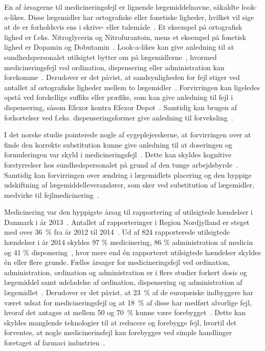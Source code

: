 En af årsagerne til medicineringsfejl er lignende lægemiddelnavne, såkaldte look-a-likes. Disse lægemidler har ortografiske eller fonetiske ligheder, hvilket vil sige at de er forholdsvis ens i skrive- eller talemåde~\citep{Garcia2017,Basco2016}. Et eksempel på ortografisk lighed er f.eks. Nitroglycerin og Nitrofurantoin, mens et eksempel på fonetisk lighed er Dopamin og Dobutamin~\citep{Basco2016}. Look-a-likes kan give anledning til at sundhedspersonalet utilsigtet bytter om på lægemidlerne~\citep{Lopes2012}, hvormed medicineringsfejl ved ordination, dispensering eller administration kan forekomme~\citep{Garcia2017,Lopes2012}. Derudover er det påvist, at sandsynligheden for fejl stiger ved antallet af ortografiske ligheder mellem to lægemidler~\citep{Basco2010}. 
Forvirringen kan ligeledes opstå ved forskellige suffiks eller præfiks, som kan give anledning til fejl i dispensering, såsom Efexor kontra Efexor Depot~\citep{DanskSelskabforPatientsikkerhed2009}. Samtidig kan brugen af forkortelser ved f.eks. dispenseringsformer give anledning til forveksling~\citep{Wittich2014}.

I det norske studie pointerede nogle af sygeplejerskerne, at forvirringen over at finde den korrekte substitution kunne give anledning til at doseringen og formuleringen var skyld i medicineringsfejl~\citep{Hakonsen2010}. Dette kan skyldes kognitive forstyrrelser hos sundhedspersonalet på grund af den tunge arbejdsbyrde~\citep{Wittich2014}. Samtidig kan forvirringen over ændring i lægemidlets placering og den hyppige udskiftning af lægemiddelleverandører, som sker ved substitution af lægemidler, medvirke til fejlmedicinering~\citep{Wittich2014}.

Medicinering var den hyppigste årsag til rapportering af utilsigtede hændelser i Danmark i år 2013~\citep{Patientombuddet2013}. Antallet af rapporteringer i Region Nordjylland er steget med over 36~\% fra år 2012 til 2014~\citep{Jensen2014}. Ud af 824 rapporterede utilsigtede hændelser i år 2014 skyldes 97 \% medicinering, 86 \% administration af medicin og 41 \% disponering~\citep{Jensen2014}, hvor mere end én rapporteret utilsigtede hændelser skyldes én eller flere grunde. Fælles årsager for medicineringsfejl ved ordination, administration, ordination og administration er i flere studier  forkert dosis og lægemiddel samt udeladelse af ordination, dispensering og administration af lægemidlet~\citep{Barker2002,Sundhedsstyrelsen2005,Lisby2005, Tully2009}.
Derudover er det påvist, at 23~\% af de europæiske indbyggere har været udsat for medicineringsfejl og at 18~\% af disse har medført alvorlige fejl, hvoraf det antages at mellem 50 og 70~\% kunne være forebygget~\citep{Garcia2017}. Dette kan skyldes manglende teknologier til at reducere og forebygge fejl, hvortil det forventes, at nogle medicinerinsfejl kan forebygges ved simple handlinger foretaget af farmaci industrien~\citep{Lopes2012}.


